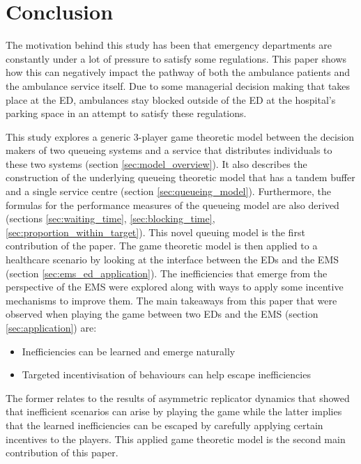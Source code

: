 \section{Conclusion}

The motivation behind this study has been that emergency departments are 
constantly under a lot of pressure to satisfy some regulations. 
This paper shows how this can negatively impact the pathway of both the 
ambulance patients and the ambulance service itself.
Due to some managerial decision making that takes place at the ED, ambulances 
stay blocked outside of the ED at the hospital's parking space in an attempt
to satisfy these regulations.

This study explores a generic 3-player game theoretic model between the 
decision makers of two queueing systems and a service that distributes 
individuals to these two systems (section \ref{sec:model_overview}).
It also describes the construction of the underlying queueing theoretic model 
that has a tandem buffer and a single service centre (section 
\ref{sec:queueing_model}).
Furthermore, the formulas for the performance measures of the queueing model 
are also derived (sections \ref{sec:waiting_time}, \ref{sec:blocking_time}, 
\ref{sec:proportion_within_target}). 
This novel queuing model is the first contribution of the paper.
The game theoretic model is then applied to a healthcare scenario by looking at
the interface between the EDs and the EMS (section 
\ref{sec:ems_ed_application}).
The inefficiencies that emerge from the perspective of the EMS were explored 
along with ways to apply some incentive mechanisms to improve them.
The main takeaways from this paper that were observed when playing the game
between two EDs and the EMS (section \ref{sec:application}) are:
\begin{itemize}
    \item Inefficiencies can be learned and emerge naturally
    \item Targeted incentivisation of behaviours can help escape inefficiencies
\end{itemize}
The former relates to the results of asymmetric replicator dynamics that showed 
that inefficient scenarios can arise by playing the game while the latter 
implies that the learned inefficiencies can be escaped by carefully applying 
certain incentives to the players.
This applied game theoretic model is the second main contribution of this paper.

